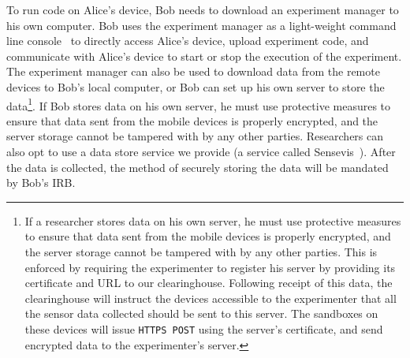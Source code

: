 To run code on Alice's device, Bob needs to download an experiment 
manager to his own computer.
Bob uses the experiment manager as a light-weight command line 
console~\cite{demo-kit} to directly access Alice's device, upload 
experiment code, and %
communicate with Alice's device to start or stop the execution of the experiment. 
The experiment manager can also be used to download data 
from the remote devices to Bob's local computer, or
Bob can set up his own server to store the data\footnote{\scriptsize
If a researcher stores data on his own server, he must use protective
measures to ensure that data sent from the mobile devices is
properly encrypted, and the server storage cannot be tampered
with by any other parties. This is enforced by requiring the experimenter to register
his server by providing its certificate and URL to our
clearinghouse. Following receipt of this data, the clearinghouse will instruct the devices
accessible to the experimenter that all the sensor data collected should be
sent to this server. The sandboxes on these devices will issue
\texttt{HTTPS POST} using the server's certificate, and send encrypted
data to the experimenter's server.}. 
If Bob stores data on his own server, he must use protective
measures to ensure that data sent from the mobile devices is
properly encrypted, and the server storage cannot be tampered
with by any other parties. Researchers can also opt to use a data 
store service we provide (a service called Sensevis~\cite{sensevis}). 
After the data is collected, the method of 
securely storing the data will be mandated by Bob's IRB.

